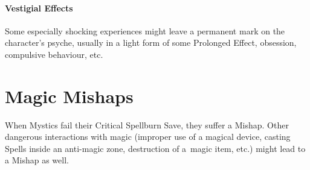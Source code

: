 \documentclass[itdr/core]{subfiles}
\begin{document}
\paragraph{Vestigial Effects}
Some especially shocking experiences might leave a permanent mark on the character's psyche, usually in a light form of some Prolonged Effect, obsession, compulsive behaviour, etc.


\vfill
\break


\section{Magic Mishaps}
\label{sec:magic_mishaps}

When Mystics fail their Critical Spellburn Save, they suffer a Mishap. Other dangerous \mbox{interactions} with magic (improper use of a magical device, casting Spells inside an anti-magic zone, destruction of a~magic item, etc.) might lead to a Mishap as well.
\end{document}
